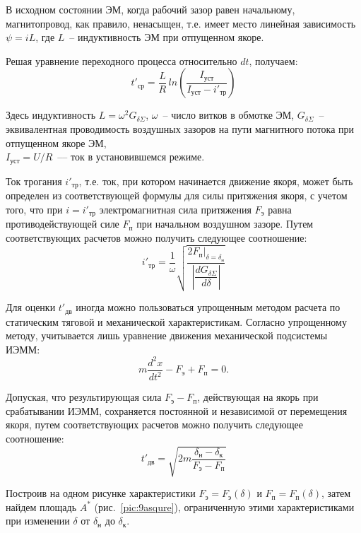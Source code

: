 В исходном состоянии ЭМ, когда рабочий зазор равен начальному, магнитопровод, как правило, ненасыщен, т.е. имеет место линейная зависимость $ \psi = iL $, где $ L $~-- индуктивность ЭМ при отпущенном якоре.

Решая уравнение переходного процесса относительно $ dt $, получаем:
\begin{equation}
\label{eq:8tshtrihSR}
t'_\text{ср} = \dfrac{L}{R}\, ln\left( \dfrac{I_\text{уст}}{I_\text{уст} - i'_\text{тр}} \right)
\end{equation}

Здесь индуктивность $ L = \omega^2 G_{\delta\Sigma} $, $ \omega $~-- число витков в обмотке ЭМ, $ G_{\delta\Sigma} $~-- эквивалентная проводимость воздушных зазоров на пути магнитного потока при отпущенном якоре ЭМ,\\ $ I_\text{уст} = U/R $~--– ток в установившемся режиме. 

Ток трогания $ i'_\text{тр} $, т.е. ток, при котором начинается движение якоря, может быть определен из соответствующей формулы для силы притяжения якоря, с учетом того, что при $ i=i'_\text{тр} $ электромагнитная сила притяжения $ F_\text{э} $ равна противодействующей силе $ F_\text{п} $ при начальном воздушном зазоре. Путем соответствующих расчетов можно получить следующее соотношение:
\[ i'_\text{тр} = \dfrac{1}{\omega} \sqrt{\dfrac{2F_\text{п}|_{\delta = \delta_\text{н}}}{\left|\dfrac{dG_{\delta\Sigma}}{d\delta}\right|}}  \]

Для оценки $ t'_\text{дв} $ иногда можно пользоваться упрощенным методом расчета по статическим тяговой и механической характеристикам. Согласно упрощенному методу, учитывается лишь уравнение движения механической подсистемы ИЭММ:
\[ m\dfrac{d^2 x}{dt^2} - F_\text{э} + F_\text{п} = 0. \] 

Допуская, что результирующая сила $ F_\text{э} - F_\text{п} $, действующая на якорь при срабатывании ИЭММ, сохраняется постоянной и независимой от перемещения якоря, путем соответствующих расчетов можно получить следующее соотношение:
\begin{equation}
\label{eq:8tshtrih}
 t'_\text{дв} = \sqrt{2m\dfrac{\delta_\text{н} - \delta_\text{к}}{F_\text{э} - F_\text{п}}}
\end{equation}

Построив на одном рисунке характеристики $ F_\text{э} = F_\text{э}(\delta) $ и $ F_\text{п} = F_\text{п}(\delta) $, затем найдем площадь $ A^* $ (рис.~\ref{pic:9asqure}), ограниченную этими характеристиками при изменении $ \delta $ от $ \delta_\text{н} $  до $ \delta_\text{к} $. 

